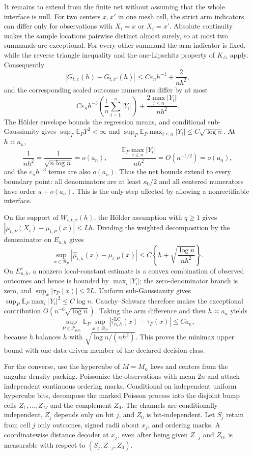 It remains to extend from the finite net without assuming that the whole interface is null.  For two centers \(x,x'\) in one mesh cell, the strict arm indicators can differ only for observations with \(X_i=x\) or \(X_i=x'\).  Absolute continuity makes the sample locations pairwise distinct almost surely, so at most two summands are exceptional.  For every other summand the arm indicator is fixed, while the reverse triangle inequality and the one-Lipschitz property of \(K_\triangle\) apply.  Consequently
\[
|G_{t,x}(h)-G_{t,x'}(h)|
\leq C\varepsilon_nh^{-3}+\frac{2}{nh^2},
\]
and the corresponding scaled outcome numerators differ by at most
\[
C\varepsilon_nh^{-3}\left(\frac1n\sum_{i=1}^n|Y_i|\right)
+\frac{2\max_{i\leq n}|Y_i|}{nh^2}.
\]
The H\"older envelope bounds the regression means, and conditional sub-Gaussianity gives \(\sup_P\mathbb E_PY^2<\infty\) and \(\sup_P\mathbb E_P\max_{i\leq n}|Y_i|\leq C\sqrt{\log n}\).  At \(h\asymp a_n\),
\[
\frac1{nh^2}=\frac1{\sqrt{n\log n}}=o(a_n),
\qquad
\frac{\mathbb E_P\max_{i\leq n}|Y_i|}{nh^2}=O(n^{-1/2})=o(a_n),
\]
and the \(\varepsilon_nh^{-3}\) terms are also \(o(a_n)\).  Thus the net bounds extend to every boundary point: all denominators are at least \(\kappa_0/2\) and all centered numerators have order \(u+o(a_n)\).  This is the only step affected by allowing a nonrectifiable interface.

On the support of \(W_{i,t,x}(h)\), the H\"older assumption with \(q\geq1\) gives
\(|\mu_{t,P}(X_i)-\mu_{t,P}(x)|\leq Lh\).  Dividing the weighted decomposition by the denominator on \(E_{n,h}\) gives
\[
\sup_{x\in\mathcal B_P}|\widehat\mu_{t,h}(x)-\mu_{t,P}(x)|
\leq C\left\{h+\sqrt{\frac{\log n}{nh^2}}\right\}.
\]
On \(E_{n,h}^c\), a nonzero local-constant estimate is a convex combination of observed outcomes and hence is bounded by \(\max_i|Y_i|\); the zero-denominator branch is zero, and \(\sup_x|\tau_P(x)|\leq2L\).  Uniform sub-Gaussianity gives \(\sup_P\mathbb E_P\max_i|Y_i|^2\leq C\log n\).  Cauchy--Schwarz therefore makes the exceptional contribution \(O(n^{-6}\sqrt{\log n})\).  Taking the arm difference and then \(h\asymp a_n\) yields
\[
\sup_{P\in\mathcal P_{\mathrm{rect}}}\mathbb E_P\sup_{x\in\mathcal B_P}
|\widehat\tau^{\mathrm{LC}}_{n,h}(x)-\tau_P(x)|
\leq Ca_n,
\]
because \(h\) balances \(h\) with \(\sqrt{\log n/(nh^2)}\).  This proves the minimax upper bound with one data-driven member of the declared decision class.

For the converse, use the hypercube of \(M=M_n\) laws and centers from the angular-density packing.  Poissonize the observations with mean \(2n\) and attach independent continuous ordering marks.  Conditional on independent uniform hypercube bits, decompose the marked Poisson process into the disjoint bump cells \(Z_1,\ldots,Z_M\) and the complement \(Z_0\).  The channels are conditionally independent, \(Z_j\) depends only on bit \(j\), and \(Z_0\) is bit-independent.  Let \(S_j\) retain from cell \(j\) only outcomes, signed radii about \(x_j\), and ordering marks.  A coordinatewise distance decoder at \(x_j\), even after being given \(Z_{-j}\) and \(Z_0\), is measurable with respect to \((S_j,Z_{-j},Z_0)\).

